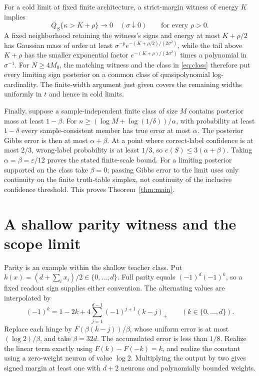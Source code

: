 \documentclass[11pt]{article}
\theoremstyle{remark}\newtheorem{remark}[theorem]{Remark}
\begin{document}
For a cold limit at fixed finite architecture, a strict-margin witness
of energy $K$ implies
\[
 Q_S\{\kappa>K+\rho\}\longrightarrow0\quad(\sigma\downarrow0)
 \qquad\text{for every }\rho>0.
\]
A fixed neighborhood retaining the witness's signs and energy at most
$K+\rho/2$ has Gaussian mass of order at least
$\sigma^{-p}e^{-(K+\rho/2)/(2\sigma^2)}$, while the tail above $K+\rho$
has the smaller exponential factor $e^{-(K+\rho)/(2\sigma^2)}$ times
a polynomial in $\sigma^{-1}$. For $N\ge4M_0$, the matching witness
and the class in \eqref{eq:class} therefore put every limiting sign
posterior on a common class of quasipolynomial log-cardinality.
The finite-width argument just given covers the remaining widths
uniformly in $t$ and hence in cold limits.

Finally, suppose a sample-independent finite class of size $M$ contains
posterior mass at least $1-\beta$. For
$n\ge(\log M+\log(1/\delta))/\alpha$, with probability at least
$1-\delta$ every sample-consistent member has true error at most $\alpha$.
The posterior Gibbs error is then at most $\alpha+\beta$. At a point
where correct-label confidence is at most $2/3$, wrong-label probability
is at least $1/3$, so $e(S)\le3(\alpha+\beta)$. Taking
$\alpha=\beta=\varepsilon/12$ proves the stated finite-scale bound.
For a limiting posterior supported on the class take $\beta=0$; passing
Gibbs error to the limit uses only continuity on the finite truth-table
simplex, not continuity of the inclusive confidence threshold.
This proves Theorem~\ref{thm:main}.

\section{A shallow parity witness and the scope limit}

Parity is an example within the shallow teacher class. Put
$k(x)=(d+\sum_i x_i)/2\in\{0,\ldots,d\}$. Full parity equals
$(-1)^d(-1)^k$, so a fixed readout sign supplies either convention.
The alternating values are
interpolated by
\[
 (-1)^k=1-2k+4\sum_{j=1}^{d-1}(-1)^{j+1}(k-j)_+
 \qquad(k\in\{0,\ldots,d\}).
\]
Replace each hinge by $F(\beta(k-j))/\beta$, whose uniform error is at
most $(\log2)/\beta$, and take $\beta=32d$. The accumulated error is
less than $1/8$. Realize the linear term exactly using
$F(k)-F(-k)=k$, and realize the constant using a zero-weight neuron of
value $\log2$. Multiplying the output by two gives signed margin at
least one with $d+2$ neurons and polynomially bounded weights.
\end{document}
